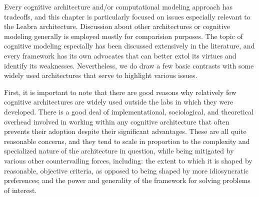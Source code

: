 \documentclass[11pt,twoside]{article}
\begin{document}
Every cognitive architecture and/or computational modeling approach has
tradeoffs, and this chapter is particularly focused on issues especially
relevant to the Leabra architecture. Discussion about other architectures or
cognitive modeling generally is employed mostly for comparision purposes. The
topic of cognitive modeling especially has been discussed extensively in the
literature, and every framework has its own advocates that can better extol
its virtues and identify its weaknesses.  Nevertheless, we do draw a few basic
contrasts with some widely used architectures that serve to highlight various
issues.

First, it is important to note that there are good reasons why relatively few
cognitive architectures are widely used outside the labs in which they were
developed.  There
is a good deal of implementational, sociological, and theoretical overhead
involved in working within any cognitive architecture that often prevents
their adoption despite their significant advantages.
These are all quite reasonable concerns, and they tend to scale in proportion
to the complexity and specialized nature of the architecture in question,
while being mitigated by various other countervailing forces, including: the
extent to which it is shaped by reasonable, objective criteria, as opposed to
being shaped by more idiosyncratic preferences; and the power and generality
of the framework for solving problems of interest.
\end{document}
